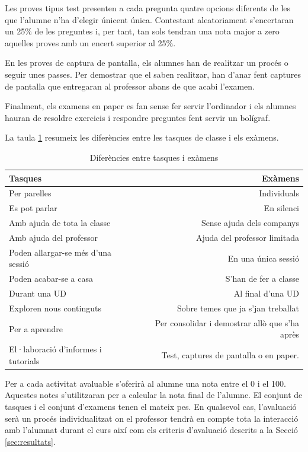\documentclass[catalan, a4paper, 12pt, titlepage]{article}
\begin{document}
Les proves tipus test presenten a cada pregunta quatre opcions diferents de les que l'alumne n'ha d'elegir únicent única.
Contestant aleatoriament s'encertaran un 25\% de les preguntes i, per tant, tan sols tendran una nota major a zero aquelles proves amb un encert superior al 25\%.

En les proves de captura de pantalla, els alumnes han de realitzar un procés o seguir unes passes.
Per demostrar que el saben realitzar, han d'anar fent captures de pantalla que entregaran al professor abans de que acabi l'examen.

Finalment, els examens en paper es fan sense fer servir l'ordinador i els alumnes hauran de resoldre exercicis i respondre preguntes fent servir un bolígraf.

La taula \ref{tab:tasquesiexamens} resumeix les diferències entre les tasques de classe i els exàmens.

\begin{table}
        \centering
        \begin{tabular}{lr}
        Tasques & Exàmens\\
        \hline
	Per parelles & Individuals\\
		Es pot parlar & En silenci \\
		Amb ajuda de tota la classe &Sense ajuda dels companys\\
		Amb ajuda del professor & Ajuda del professor limitada\\
		Poden allargar-se més d'una sessió & En una única sessió\\
		Poden acabar-se a casa & S'han de fer a classe\\
		Durant una UD & Al final d'una UD \\
		Exploren nous continguts & Sobre temes que ja s'jan treballat\\
		Per a aprendre & Per consolidar i demostrar allò que s'ha après\\
		El·laboració d'informes i tutorials & Test, captures de pantalla o en paper.

\end{tabular}
        \caption{Diferències entre tasques i exàmens} \label{tab:tasquesiexamens}
\end{table}

Per a cada activitat avaluable s'oferirà al alumne una nota entre el 0 i el 100.
Aquestes notes s'utilitzaran per a calcular la nota final de l'alumne.
El conjunt de tasques i el conjunt d'examens tenen el mateix pes.
En qualsevol cas, l'avaluació serà un procés individualitzat on el professor tendrà en compte tota la interacció amb l'alumnat durant el curs així com els criteris d'avaluació descrits a la Secció \ref{sec:resultats}.
\end{document}

